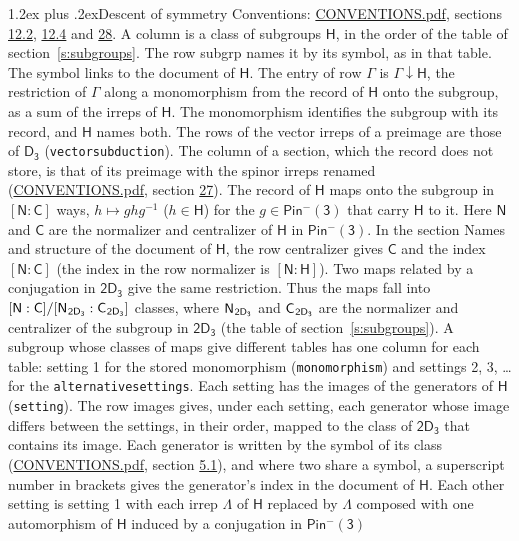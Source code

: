 \documentclass[10pt,a4paper]{article}
\makeatletter
\renewcommand\section{\@startsection{section}{1}{\z@}{-3ex plus -1ex minus -.2ex}%
  {1.2ex plus .2ex}{\normalfont\large\sffamily\bfseries\color{parttitle}}}
\numberwithin{equation}{section}
\newcommand{\grp}[1]{\mathsf{#1}}
\newcommand{\grpindex}[2]{[#1 : #2]}
\newcommand{\restr}[2]{#1\!\downarrow#2}
\newcommand{\hairsp}{\mkern1mu}
\makeatother
\begin{document}
\section{Descent of symmetry}\label{s:subduction}
Conventions: \href{../../CONVENTIONS.pdf}{CONVENTIONS.pdf}, sections \href{../../../rotation/CONVENTIONS.pdf\#conv.12.2}{12.2}, \href{../../../rotation/CONVENTIONS.pdf\#conv.12.4}{12.4} and \href{../../CONVENTIONS.pdf\#conv.28}{28}.
A column is a class of subgroups $\grp{H}$, in the order of the table of section~\ref{s:subgroups}. The row subgrp names it by its symbol, as in that table. The symbol links to the document of $\grp{H}$. The entry of row $\Gamma$ is $\restr{\Gamma}{\grp{H}}$, the restriction of $\Gamma$ along a monomorphism from the record of $\grp{H}$ onto the subgroup, as a sum of the irreps of $\grp{H}$. The monomorphism identifies the subgroup with its record, and $\grp{H}$ names both. The rows of the vector irreps of a preimage are those of \href{../../../rotation/data/pdf/D3.pdf}{$\grp{D_{3}}$} (\texttt{vectorsubduction}). The column of a section, which the record does not store, is that of its preimage with the spinor irreps renamed (\href{../../CONVENTIONS.pdf}{CONVENTIONS.pdf}, section \href{../../CONVENTIONS.pdf\#conv.27}{27}). \label{n:group.normalizer.o3}\label{n:group.centralizer.o3}\label{n:element.h}The record of $\grp{H}$ maps onto the subgroup in $\grpindex{\grp{N}}{\grp{C}}$ ways, $h \mapsto g h g^{-1}$ ($h \in \grp{H}$) for the $g \in \grp{Pin^{-}(3)}$ that carry $\grp{H}$ to it. Here $\grp{N}$ and $\grp{C}$ are the normalizer and centralizer of $\grp{H}$ in \href{Pinminus3.pdf}{$\grp{Pin^{-}(3)}$}. In the section Names and structure of the document of $\grp{H}$, the row centralizer gives $\grp{C}$ and the index $\grpindex{\grp{N}}{\grp{C}}$ (the index in the row normalizer is $\grpindex{\grp{N}}{\grp{H}}$). Two maps related by a conjugation in $\grp{2D_{3}}$ give the same restriction. Thus the maps fall into $\grpindex{\grp{N}}{\grp{C}}/\grpindex{\grp{N}_{\hairsp \grp{2D_{3}}}}{\grp{C}_{\hairsp \grp{2D_{3}}}}$ classes, where $\grp{N}_{\hairsp \grp{2D_{3}}}$ and $\grp{C}_{\hairsp \grp{2D_{3}}}$ are the normalizer and centralizer of the subgroup in $\grp{2D_{3}}$ (the table of section~\ref{s:subgroups}). \label{n:head.setting}A subgroup whose classes of maps give different tables has one column for each table: setting 1 for the stored monomorphism (\texttt{monomorphism}) and settings 2, 3, \dots{} for the \texttt{alternativesettings}. Each setting has the images of the generators of $\grp{H}$ (\texttt{setting}). \label{n:head.images}The row images gives, under each setting, each generator whose image differs between the settings, in their order, mapped to the class of $\grp{2D_{3}}$ that contains its image. Each generator is written by the symbol of its class (\href{../../CONVENTIONS.pdf}{CONVENTIONS.pdf}, section \href{../../../rotation/CONVENTIONS.pdf\#conv.5.1}{5.1}), and where two share a symbol, a superscript number in brackets gives the generator's index in the document of $\grp{H}$. \label{n:irrep.Delta}Each other setting is setting 1 with each irrep $\Lambda$ of $\grp{H}$ replaced by $\Lambda$ composed with one automorphism of $\grp{H}$ induced by a conjugation in \href{Pinminus3.pdf}{$\grp{Pin^{-}(3)}$} 
\end{document}
